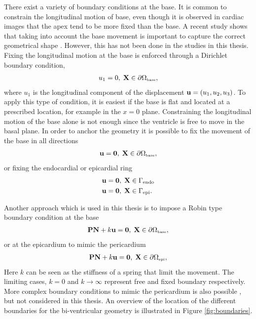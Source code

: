 There exist a variety of boundary conditions at the base.
It is common to constrain the longitudinal motion of
base, even though it is observed in cardiac images that the apex tend
to be more fixed than the base. A recent study shows that taking into
account the base movement is important to capture the correct
geometrical shape \cite{palit2016passive}. However, this has not been
done in the studies in this thesis.
Fixing the longitudinal motion at the base is enforced through a
Dirichlet boundary condition,
\begin{align}
  u_1 = 0,  \;  \mathbf{X} \in \partial \Omega_{ \textnormal{\tiny\text{base}}},
\end{align}
where $u_1$ is the longitudinal component of the displacement $\mathbf{u} =
(u_1, u_2, u_3)$. To apply this type of condition, it is easiest if
the base is flat and located at a prescribed location, for example in
the $x= 0$ plane. Constraining the longitudinal motion of the base
alone is not enough since the ventricle is free to move in the basal
plane. In order to anchor the geometry it is possible to fix the
movement of the base in all directions
\begin{align}
  \mathbf{u} = \mathbf{0},  \;  \mathbf{X} \in \partial \Omega_{ \textnormal{\tiny\text{base}}},
\end{align}
or fixing the endocardial or epicardial ring
\begin{align}
  \mathbf{u} &= \mathbf{0},  \;  \mathbf{X} \in \Gamma_{\mathrm{endo}} \\
  \mathbf{u} &= \mathbf{0},  \;  \mathbf{X} \in \Gamma_{\mathrm{epi}}.
\end{align}

Another approach which is used in this thesis is to impose a Robin
type boundary condition at the base
\begin{align}
  \mathbf{P} \mathbf{N} + k \mathbf{u} = \mathbf{0},  \;  \mathbf{X} \in \partial \Omega_{ \textnormal{\tiny\text{base}}}, 
\end{align}
or at the epicardium to mimic the pericardium
\begin{align}
  \mathbf{P} \mathbf{N} + k \mathbf{u} = \mathbf{0},  \;  \mathbf{X} \in \partial \Omega_{ \textnormal{\tiny \text{epi}}}, 
\end{align}
Here $k$ can be seen as the stiffness of a spring that limit the
movement. The limiting cases, $k = 0$ and $k \rightarrow
\infty$ represent free and fixed boundary respectively.
More complex boundary conditions to mimic the pericardium is also
possible \cite{fritz2014simulation}, but not considered in this thesis.
An overview of the location of the different boundaries for the
bi-ventricular geometry is illustrated in Figure \ref{fig:boundaries}.

